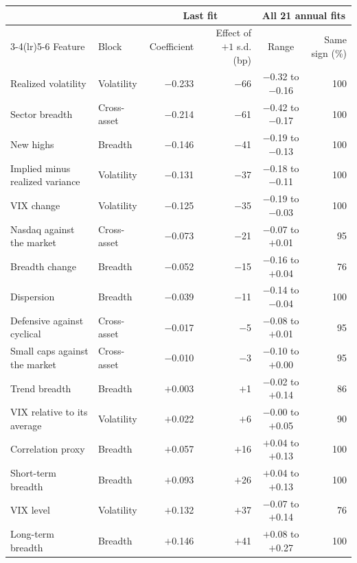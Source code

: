 \begin{tabular}{llrrcr}
\toprule
 & & \multicolumn{2}{c}{Last fit} & \multicolumn{2}{c}{All 21 annual fits} \\
\cmidrule(lr){3-4}\cmidrule(lr){5-6}
Feature & Block & Coefficient & Effect of $+1$ s.d. (bp) & Range & Same sign (\%) \\
\midrule
Realized volatility & Volatility & $-$0.233 & $-$66 & $-$0.32 to $-$0.16 & 100 \\
Sector breadth & Cross-asset & $-$0.214 & $-$61 & $-$0.42 to $-$0.17 & 100 \\
New highs & Breadth & $-$0.146 & $-$41 & $-$0.19 to $-$0.13 & 100 \\
Implied minus realized variance & Volatility & $-$0.131 & $-$37 & $-$0.18 to $-$0.11 & 100 \\
VIX change & Volatility & $-$0.125 & $-$35 & $-$0.19 to $-$0.03 & 100 \\
Nasdaq against the market & Cross-asset & $-$0.073 & $-$21 & $-$0.07 to $+$0.01 & 95 \\
Breadth change & Breadth & $-$0.052 & $-$15 & $-$0.16 to $+$0.04 & 76 \\
Dispersion & Breadth & $-$0.039 & $-$11 & $-$0.14 to $-$0.04 & 100 \\
Defensive against cyclical & Cross-asset & $-$0.017 & $-$5 & $-$0.08 to $+$0.01 & 95 \\
Small caps against the market & Cross-asset & $-$0.010 & $-$3 & $-$0.10 to $+$0.00 & 95 \\
Trend breadth & Breadth & $+$0.003 & $+$1 & $-$0.02 to $+$0.14 & 86 \\
VIX relative to its average & Volatility & $+$0.022 & $+$6 & $-$0.00 to $+$0.05 & 90 \\
Correlation proxy & Breadth & $+$0.057 & $+$16 & $+$0.04 to $+$0.13 & 100 \\
Short-term breadth & Breadth & $+$0.093 & $+$26 & $+$0.04 to $+$0.13 & 100 \\
VIX level & Volatility & $+$0.132 & $+$37 & $-$0.07 to $+$0.14 & 76 \\
Long-term breadth & Breadth & $+$0.146 & $+$41 & $+$0.08 to $+$0.27 & 100 \\
\bottomrule
\end{tabular}
